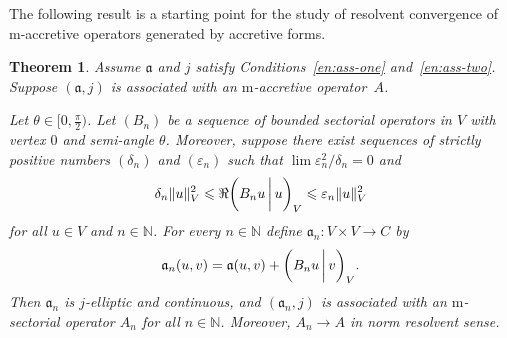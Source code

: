 \documentclass[a4paper,oneside,12pt]{amsart}
\theoremstyle{plain}
\newtheorem{theorem}{Theorem}[section]
\theoremstyle{definition}
\let\le=\leqslant
\DeclarePairedDelimiter\norm{\lVert}{\rVert}
\begin{document}
The following result is a starting point for the study of resolvent convergence of {\ensuremath{\text{m}}}-accretive operators generated by accretive forms.
\begin{theorem}\label{thm:approx}
Assume ${{\mathfrak{{a}}}}$ and $j$ satisfy Conditions~\ref{en:ass-one} and~\ref{en:ass-two}.
Suppose $({{\mathfrak{{a}}}},j)$ is associated with an {\ensuremath{\text{m}}}-accretive operator~$A$.

Let $\theta\in[0,\tfrac{\pi}{2})$. 
Let $(B_n)$ be a sequence of bounded sectorial operators in $V$ with vertex $0$ and semi-angle $\theta$. 
Moreover, suppose there exist sequences of strictly positive numbers $(\delta_n)$ and $({\varepsilon}_n)$ 
such that $\lim {{\varepsilon}_n^2}/{\delta_n}=0$ and 
\begin{equation}\label{eq:lowup-est-Bn}
    \delta_n\norm{u}_V^2 \le \Re {{\ifthenelse{\equal{auto}{auto}}{\left({B_n u}\mkern3mu{\biggm|}\mkern3mu {u}\right)}{}
\ifthenelse{\equal{auto}{b}}{\bigl({B_n u}\mkern3mu{\biggm|}\mkern3mu {u}\bigr)}{}
\ifthenelse{\equal{auto}{B}}{\Bigl({B_n u}\mkern3mu{\bigm|}\mkern3mu {u}\Bigr)}{}
}}_V \le {\varepsilon}_n\norm{u}_V^2
\end{equation}
for all $u\in V$ and $n\in{\mathbb{N}}$.
For every $n\in{\mathbb{N}}$ define ${{\mathfrak{{a}}}}_n\colon V\times V\to C$ by
\[
    {{\mathfrak{{a}}}}_n(u,v) = {{\mathfrak{{a}}}}(u,v) + {{\ifthenelse{\equal{auto}{auto}}{\left({B_n u}\mkern3mu{\biggm|}\mkern3mu {v}\right)}{}
\ifthenelse{\equal{auto}{b}}{\bigl({B_n u}\mkern3mu{\biggm|}\mkern3mu {v}\bigr)}{}
\ifthenelse{\equal{auto}{B}}{\Bigl({B_n u}\mkern3mu{\bigm|}\mkern3mu {v}\Bigr)}{}
}}_V.
\]
Then ${{\mathfrak{{a}}}}_n$ is $j$-elliptic and continuous, and $({{\mathfrak{{a}}}}_n,j)$ is associated with an {\ensuremath{\text{m}}}-sectorial operator $A_n$ for all $n\in{\mathbb{N}}$.
Moreover, $A_n\to A$ in norm resolvent sense.
\end{theorem}
\end{document}
